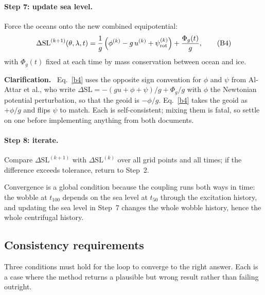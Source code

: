 \documentclass[11pt,a4paper]{article}
\newcommand{\dSL}{\Delta\mathrm{SL}}
\renewenvironment{leftbar}{%
  \def\FrameCommand{{\color{clarbar}\vrule width 2.5pt}\hspace{8pt}}%
  \MakeFramed{\advance\hsize-\width\FrameRestore}}%
  {\endMakeFramed}
\newenvironment{clar}{\begin{leftbar}\small\noindent\textbf{Clarification.}\ }{\end{leftbar}}
\begin{document}
\paragraph{Step 7: update sea level.} Force the oceans onto the new combined equipotential:
\begin{equation}
  \dSL^{(k+1)}(\theta,\lambda,t)=\frac1g\left(\phi^{(k)}-g\,u^{(k)}+\psi^{(k)}_{\rm rot}\right)+\frac{\Phi_g(t)}{g},
  \tag{B4}\label{b4}
\end{equation}
with $\Phi_g(t)$ fixed at each time by mass conservation between ocean and ice.

\begin{clar}
Eq.~\eqref{b4} uses the opposite sign convention for $\phi$ and $\psi$ from Al-Attar et al., who
write $\dSL=-(gu+\phi+\psi)/g+\Phi_g/g$ with $\phi$ the Newtonian potential perturbation, so that the
geoid is $-\phi/g$. Eq.~\eqref{b4} takes the geoid as $+\phi/g$ and flips $\psi$ to match. Each is
self-consistent; mixing them is fatal, so settle on one before implementing anything from both
documents.
\end{clar}

\paragraph{Step 8: iterate.} Compare $\dSL^{(k+1)}$ with $\dSL^{(k)}$ over all grid points and all
times; if the difference exceeds tolerance, return to Step~2.

Convergence is a global condition because the coupling runs both ways in time: the wobble at
$t_{100}$ depends on the sea level at $t_{50}$ through the excitation history, and updating the sea
level in Step~7 changes the whole wobble history, hence the whole centrifugal history.

\subsection{Consistency requirements}
\label{sec:consistency}

Three conditions must hold for the loop to converge to the right answer. Each is a case where the
method returns a plausible but wrong result rather than failing outright.
\end{document}
